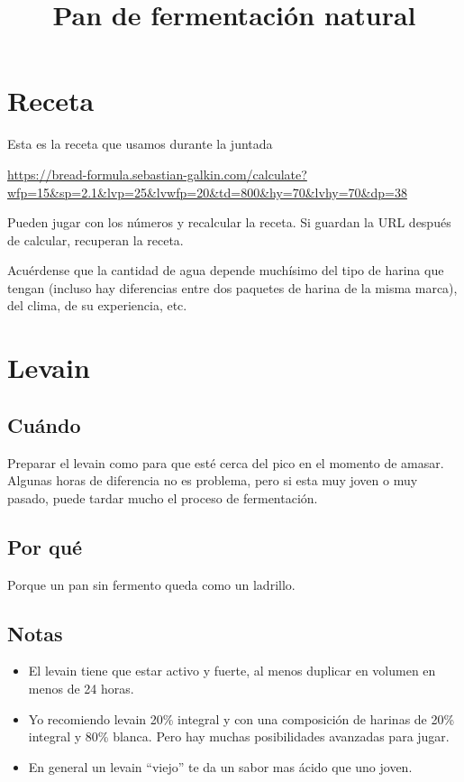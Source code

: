 \documentclass[10pt,a4paper]{article}
\title{Pan de fermentación natural}
\begin{document}
\maketitle
\tableofcontents

\section{Receta}
Esta es la receta que usamos durante la juntada

\url{https://bread-formula.sebastian-galkin.com/calculate?wfp=15&sp=2.1&lvp=25&lvwfp=20&td=800&hy=70&lvhy=70&dp=38}

Pueden jugar con los números y recalcular la receta.  Si guardan la URL
después de calcular, recuperan la receta.

Acuérdense que la cantidad de agua depende muchísimo del tipo de harina que
tengan (incluso hay diferencias entre dos paquetes de harina de la misma marca),
del clima, de su experiencia, etc.

\section{Levain}
\subsection*{Cuándo}
Preparar el levain como para que esté cerca del pico en el momento de amasar.
Algunas horas de diferencia no es problema, pero si esta muy joven o muy pasado,
puede tardar mucho el proceso de fermentación.

\subsection*{Por qué}
Porque un pan sin fermento queda como un ladrillo.

\subsection*{Notas}
  \begin{itemize}
    \item El levain tiene que estar activo y fuerte, al menos duplicar en
      volumen en menos de 24 horas.
    \item Yo recomiendo levain 20\% integral y con una composición de harinas de
      20\% integral y 80\% blanca. Pero hay muchas posibilidades avanzadas para jugar.
    \item En general un levain ``viejo'' te da un sabor mas ácido que uno joven.
  \end{itemize}
\end{document}
